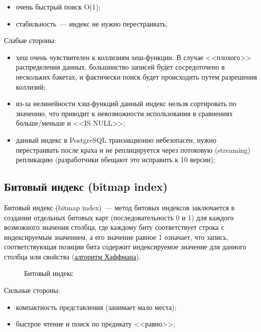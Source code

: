 \begin{itemize}
  \item очень быстрый поиск O(1);
  \item стабильность~--- индекс не нужно перестраивать;
\end{itemize}

Слабые стороны:

\begin{itemize}
  \item хеш очень чувствителен к коллизиям хеш-функции. В случае <<плохого>> распределения данных, большинство записей будет сосредоточено в нескольких бакетах, и фактически поиск будет происходить путем разрешения коллизий;
  \item из-за нелинейности хэш-функций данный индекс нельзя сортировать по значению, что приводит к невозможности использования в сравнениях больше/меньше и <<IS NULL>>;
  \item данный индекс в PostgreSQL транзакционно небезопасен, нужно перестраивать после краха и не реплицируется через потоковую (streaming) репликацию (разработчики обещают это исправить к 10 версии);
\end{itemize}




\subsection{Битовый индекс (bitmap index)}
\label{sec:indexes-bitmap-index}

Битовый индекс (bitmap index)~--- метод битовых индексов заключается в создании отдельных битовых карт (последовательность 0 и 1) для каждого возможного значения столбца, где каждому биту соответствует строка с индексируемым значением, а его значение равное 1 означает, что запись, соответствующая позиции бита содержит индексируемое значение для данного столбца или свойства (\href{https://ru.wikipedia.org/wiki/%D0%9A%D0%BE%D0%B4_%D0%A5%D0%B0%D1%84%D1%84%D0%BC%D0%B0%D0%BD%D0%B0}{алгоритм Хаффмана}).

\begin{figure}[ht!]
  \caption{Битовый индекс}
  \label{fig:bitmap_index}
\end{figure}

Сильные стороны:

\begin{itemize}
  \item компактность представления (занимает мало места);
  \item быстрое чтение и поиск по предикату <<равно>>;
\end{itemize}

